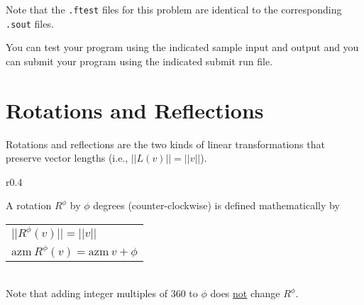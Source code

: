 \documentclass[12pt]{article}
\begin{document}
Note that the {\tt .ftest} files for this problem are identical
to the corresponding {\tt .sout} files.

You can test your program using the indicated sample input and
output and you can submit your program using the indicated submit
run file.

\section{Rotations and Reflections}
Rotations and reflections are the two kinds of linear transformations
that preserve vector lengths (i.e., $||L(v)||=||v||$).

\begin{minipage}{\textwidth}\raggedright
\begin{wrapfigure}[5]{r}{0.4\textwidth}
\end{wrapfigure}
A rotation $R^\phi$ by $\phi$ degrees (counter-\EOL clockwise)
is defined mathematically by
\hspace*{0.2in}\begin{tabular}[t]{l}
$||R^\phi(v)|| = ||v||$ \\
$\mathrm{azm}~R^\phi(v) = \mathrm{azm}~v + \phi$ \\
\end{tabular}
\\[1ex]
Note that adding integer multiples of 360 to $\phi$
does \underline{not} change $R^\phi$.
\end{minipage}
\end{document}
